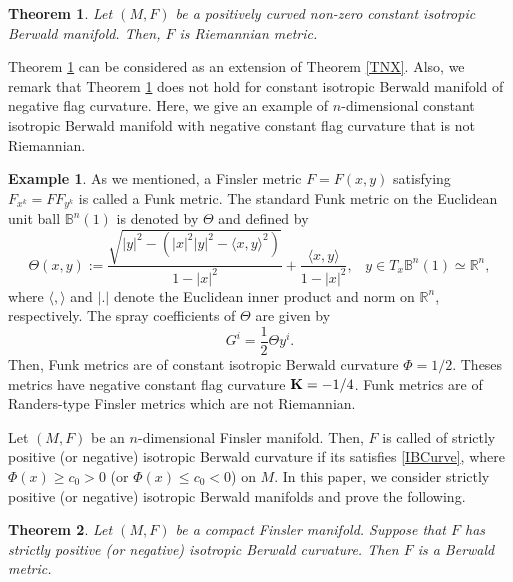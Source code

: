 \documentclass[12pt,a4paper]{article}
\newtheorem{thm}{Theorem}[section]
\theoremstyle{definition}
\newtheorem{ex}{Example}
\numberwithin{equation}{section}
\begin{document}
\begin{thm}\label{MTHM2}
Let $(M, F)$ be a positively curved non-zero constant isotropic Berwald manifold. Then, $F$ is Riemannian metric.
\end{thm}
Theorem \ref{MTHM2} can be considered as an extension of Theorem \ref{TNX}. Also, we remark that Theorem \ref{MTHM2} does not hold for constant isotropic Berwald manifold of negative flag curvature. Here, we  give an example of $n$-dimensional  constant isotropic  Berwald manifold with negative constant flag curvature  that is not Riemannian.
\begin{ex}
As we mentioned, a Finsler metric $F=F(x, y)$ satisfying $F_{x^k}=FF_{y^k}$ is called a Funk metric. The standard Funk metric on the
Euclidean unit ball $\mathbb{B}^n(1)$ is denoted by $\Theta$ and defined by
\begin{equation}\label{Funk}
\Theta(x,y):=\frac{\sqrt{|y|^2-(|x|^2|y|^2-\langle x, y \rangle^2)}}{1-|x|^2}+\frac{\langle x, y \rangle}{1-|x|^2}, \,\,\,\,\,y\in T_x\mathbb{B}^n(1)\simeq \mathbb{R}^n,
\end{equation}
where $\langle, \rangle$ and $| . |$ denote the Euclidean inner product and norm on $\mathbb{R}^n$, respectively. The spray coefficients of  $\Theta$  are given by
\[
G^i=\frac{1}{2} \Theta y^i.
\]
Then, Funk metrics are of constant isotropic  Berwald curvature $\Phi=1/2$. Theses metrics have  negative constant flag curvature ${\bf K}=-1/4$. Funk metrics are of Randers-type Finsler metrics which are not Riemannian.
\end{ex}



\bigskip

Let $(M, F)$ be an $n$-dimensional Finsler manifold. Then, $F$ is called of strictly positive (or negative) isotropic Berwald curvature if its satisfies \eqref{IBCurve}, where  $\Phi(x)\ge c_0>0$ (or $\Phi(x)\leq c_0<0$) on $M$. In this paper, we consider strictly positive (or negative) isotropic Berwald manifolds and prove the following.

\begin{thm}\label{MTHM2.5}
Let $(M,F)$ be a compact  Finsler manifold. Suppose that $F$ has strictly positive (or negative) isotropic Berwald curvature. Then $F$ is a Berwald metric.
\end{thm}



\bigskip
\end{document}
